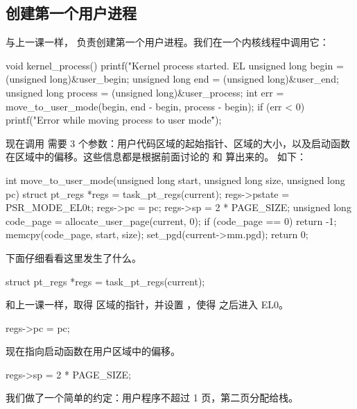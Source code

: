 \subsection{创建第一个用户进程}

与上一课一样， 负责创建第一个用户进程。我们在一个内核线程中调用它：

\begin{ccode}
void kernel_process(){
	printf("Kernel process started. EL %
	unsigned long begin = (unsigned long)&user_begin;
	unsigned long end = (unsigned long)&user_end;
	unsigned long process = (unsigned long)&user_process;
	int err = move_to_user_mode(begin, end - begin, process - begin);
	if (err < 0){
		printf("Error while moving process to user mode\n\r");
	}
}
\end{ccode}

现在调用  需要 3 个参数：用户代码区域的起始指针、区域的大小，以及启动函数在区域中的偏移。这些信息都是根据前面讨论的  和  算出来的。 如下：

\begin{ccode}
int move_to_user_mode(unsigned long start, unsigned long size, unsigned long pc)
{
	struct pt_regs *regs = task_pt_regs(current);
	regs->pstate = PSR_MODE_EL0t;
	regs->pc = pc;
	regs->sp = 2 *  PAGE_SIZE;
	unsigned long code_page = allocate_user_page(current, 0);
	if (code_page == 0)	{
		return -1;
	}
	memcpy(code_page, start, size);
	set_pgd(current->mm.pgd);
	return 0;
}
\end{ccode}

下面仔细看看这里发生了什么。

\begin{ccode}
	struct pt_regs *regs = task_pt_regs(current);
\end{ccode}

和上一课一样，取得  区域的指针，并设置 ，使得  之后进入 EL0。

\begin{ccode}
	regs->pc = pc;
\end{ccode}

 现在指向启动函数在用户区域中的偏移。

\begin{ccode}
	regs->sp = 2 *  PAGE_SIZE;
\end{ccode}

我们做了一个简单的约定：用户程序不超过 1 页，第二页分配给栈。

